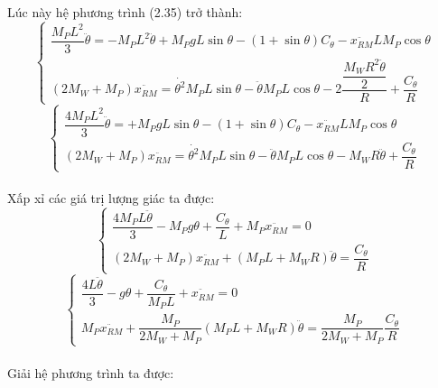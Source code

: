 \paragraph{}Lúc này hệ phương trình (2.35) trở thành:
\begin{equation}
\begin{cases}
\dfrac{M_{P}L^{2}}{3}\ddot{\theta} = -M_{P}L^{2}\ddot{\theta} + M_{P}gL\sin{\theta} - (1 + \sin{\theta})C_{\theta} -\ddot{x_{RM}}LM_{P}\cos{\theta}\\
(2M_{W}+M_{P})\ddot{x_{RM}} =  \dot{\theta^{2}}M_{P}L\sin{\theta} - \ddot{\theta}M_{P}L\cos{\theta} - 2\dfrac{\dfrac{M_{W}R^{2}\ddot{\theta}}{2}}{R} + \dfrac{C_{\theta}}{R}
\end{cases}
\end{equation}
\begin{equation}
\begin{cases}
\dfrac{4M_{P}L^{2}}{3}\ddot{\theta} = + M_{P}gL\sin{\theta} - (1 + \sin{\theta})C_{\theta} -\ddot{x_{RM}}LM_{P}\cos{\theta}\\
(2M_{W}+M_{P})\ddot{x_{RM}} =  \dot{\theta^{2}}M_{P}L\sin{\theta} - \ddot{\theta}M_{P}L\cos{\theta} - M_{W}R\ddot{\theta} + \dfrac{C_{\theta}}{R}
\end{cases}
\end{equation}
\paragraph{}Xấp xỉ các giá trị lượng giác ta được: 
\begin{equation}
\begin{cases}
\dfrac{4M_{P}L\ddot{\theta}}{3} - M_{P}g\theta + \dfrac{C_{\theta}}{L} + M_{P}\ddot{x_{RM}} = 0\\
(2M_{W}+M_{P})\ddot{x_{RM}} + (M_{P}L+M_{W}R)\ddot{\theta} = \dfrac{C_{\theta}}{R}
\end{cases}
\end{equation}
\begin{equation}
\begin{cases}
\dfrac{4L\ddot{\theta}}{3} - g\theta + \dfrac{C_{\theta}}{M_{P}L} + \ddot{x_{RM}} = 0\\
M_{P}\ddot{x_{RM}} + \dfrac{M_{P}}{2M_{W}+M_{P}}(M_{P}L+M_{W}R)\ddot{\theta} = \dfrac{M_{P}}{2M_{W}+M_{P}}\dfrac{C_{\theta}}{R}
\end{cases}
\end{equation}
\paragraph{}Giải hệ phương trình ta được: 

